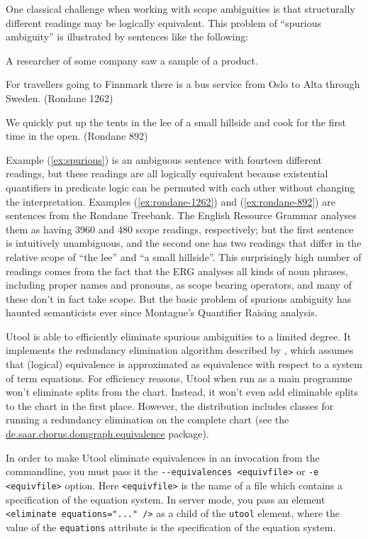 One classical challenge when working with scope ambiguities is that
structurally different readings may be logically equivalent. This
problem of ``spurious ambiguity'' is illustrated by sentences like the
following:

\begin{examples}
\item \label{ex:spurious}
A researcher of some company saw a sample of a product.
\item
  \label{ex:rondane-1262} 
  For travellers going to Finnmark there is a bus service from Oslo to
  Alta through Sweden. (Rondane 1262)
\item 
  \label{ex:rondane-892}
  We quickly put up the tents in the lee of a small hillside and cook
  for the first time in the open. (Rondane 892)
\end{examples}

Example (\ref{ex:spurious}) is an ambiguous sentence with fourteen
different readings, but these readings are all logically equivalent
because existential quantifiers in predicate logic can be permuted
with each other without changing the interpretation. Examples
(\ref{ex:rondane-1262}) and (\ref{ex:rondane-892}) are sentences from
the Rondane Treebank. The English Resource Grammar analyses them as
having 3960 and 480 scope readings, respectively; but the first
sentence is intuitively unambiguous, and the second one has two
readings that differ in the relative scope of ``the lee'' and ``a
small hillside''. This surprisingly high number of readings comes from
the fact that the ERG analyses all kinds of noun phrases, including
proper names and pronouns, as scope bearing operators, and many of
these don't in fact take scope. But the basic problem of spurious
ambiguity has haunted semanticists ever since Montague's Quantifier
Raising analysis.

Utool is able to efficiently eliminate spurious ambiguities to a
limited degree. It implements the redundancy elimination algorithm
described by , which assumes that (logical)
equivalence is approximated as equivalence with respect to a system of
term equations. For efficiency reasons, Utool when run as a main
programme won't eliminate splits from the chart. Instead, it won't
even add eliminable splits to the chart in the first place. However,
the distribution includes classes for running a redundancy elimination
on the complete chart (see the
\url{de.saar.chorus.domgraph.equivalence} package).

In order to make Utool eliminate equivalences in an invocation from
the commandline, you must pass it the
\verb?--equivalences <equivfile>? or \verb?-e <equivfile>?
option. Here \verb?<equivfile>? is the name of a file which contains a
specification of the equation system. In server mode, you pass an
element \verb?<eliminate equations="..." />? as a child of the
\verb?utool? element, where the value of the \verb?equations?
attribute is the specification of the equation system.


